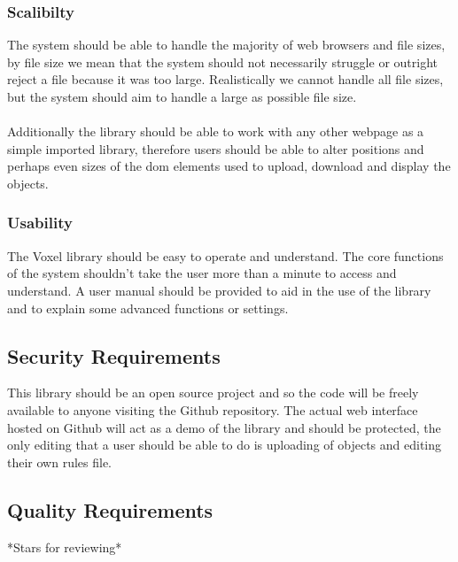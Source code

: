 \documentclass[english]{article}
\begin{document}
		\subsubsection{Scalibilty}
		The system should be able to handle the majority of web browsers and file sizes, by file size we mean that the system should not necessarily struggle or outright reject a file because it was too large. Realistically we cannot handle all file sizes, but the system should aim to handle a large as possible file size. 
		\\\\
		Additionally the library should be able to work with any other webpage as a simple imported library, therefore users should be able to alter positions and perhaps even sizes of the dom elements used to upload, download and display the objects.
		
		\subsubsection{Usability}
		The Voxel library should be easy to operate and understand. The core functions of the system shouldn't take the user more 
		than a minute to access and understand. A user manual should be provided to aid in the use of the library and to explain some advanced functions or settings.
		
		\subsection{Security Requirements}
		This library should be an open source project and so the code will be freely available to anyone visiting the Github repository. The actual web interface hosted on Github will act as a demo of the library and should be protected, the only editing that a user should be able to do is uploading of objects and editing their own rules file.
		
		\subsection{Quality Requirements}
		*Stars for reviewing*
		
	\pagebreak
	
\end{document}
